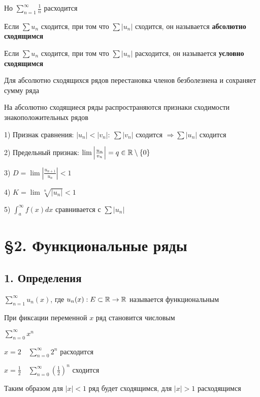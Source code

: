 \documentclass[12pt]{article}
\begin{document}
    Но $\sum_{n = 1}^\infty \frac{1}{n}$ расходится

    \Def Если $\sum u_n$ сходится, при том что $\sum |u_n|$ сходится, он называется \textbf{абсолютно сходящимся}

    \hypertarget{conditionalconvergence}{}

    \Defs Если $\sum u_n$ сходится, при том что $\sum |u_n|$ расходится, он называется \textbf{условно сходящимся}

    \Notas Для абсолютно сходящихся рядов перестановка членов безболезнена и сохраняет сумму ряда

    \Notas На абсолютно сходящиеся ряды распространяются признаки сходимости знакоположительных рядов

    1) Признак сравнения: $|u_n| < |v_n|: \ \sum |v_n|$ сходится $\Longrightarrow \sum |u_n|$ сходится

    2) Предельный признак: $\lim \left|\frac{u_n}{v_n}\right| = q \in \mathbb{R} \setminus \{0\}$

    3) $D = \lim \left|\frac{u_{n + 1}}{u_n}\right| < 1$

    4) $K = \lim \sqrt[n]{|{u_n}|} < 1$

    5) $\int_a^\infty f(x)dx$ сравнивается с $\sum |u_n|$

    \clearpage


    \section{\S 2. Функциональные ряды}

    \hypertarget{functionalseries}{}

    \subsection{1. Определения}

    \Def $\sum_{n = 1}^\infty u_n(x)$, где $u_n(x) : E \subset \mathbb{R} \to \mathbb{R}$ называется функциональным

    \Notas При фиксации переменной $x$ ряд становится числовым

    \Exs $\sum_{n = 0}^\infty x^n$

    $x = 2 \quad \sum_{n = 0}^\infty 2^n$ расходится

    $x = \frac{1}{2} \quad \sum_{n = 0}^\infty \left(\frac{1}{2}\right)^n$ сходится

    Таким образом для $|x| < 1$ ряд будет сходящимся, для $|x| > 1$ расходящимся
\end{document}
